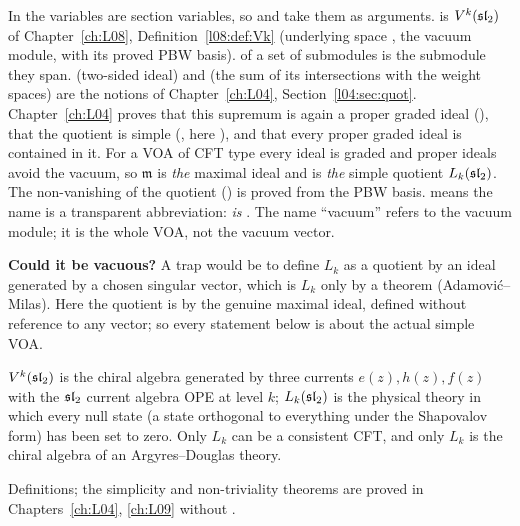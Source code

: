 \begin{dictionary}
In  the variables  are section
variables, so  and  take them as arguments.
 is $V^k(\mathfrak{sl}_2)$ of Chapter~\ref{ch:L08}, Definition~\ref{l08:def:Vk}
(underlying space , the vacuum module, with its proved PBW basis).  of a set of
submodules is the submodule they span.  (two-sided ideal) and 
(the sum of its intersections with the weight spaces) are the notions of Chapter~\ref{ch:L04},
Section~\ref{l04:sec:quot}. Chapter~\ref{ch:L04} proves that this supremum is again a proper graded ideal
(), that the quotient is simple (, here
), and that every proper graded ideal is contained in it. For a VOA of CFT type every
ideal is graded and proper ideals avoid the vacuum, so $\mathfrak m$ is \emph{the} maximal ideal and
 is \emph{the} simple quotient $L_k(\mathfrak{sl}_2)$. The non-vanishing of the quotient
() is proved from the PBW basis.  means the name is a transparent
abbreviation:  \emph{is} . The name ``vacuum''
refers to the vacuum module; it is the whole VOA, not the vacuum vector.

\textbf{Could it be vacuous?} A trap would be to define $L_k$ as a quotient by an ideal generated by a chosen
singular vector, which is $L_k$ only by a theorem (Adamovi\'c--Milas). Here the quotient is by the genuine
maximal ideal, defined without reference to any vector; so every statement below is about the actual
simple VOA.
\end{dictionary}

\begin{physics}
$V^k(\mathfrak{sl}_2)$ is the chiral algebra generated by three currents $e(z),h(z),f(z)$ with the $\mathfrak{sl}_2$
current algebra OPE at level $k$; $L_k(\mathfrak{sl}_2)$ is the physical theory in which every null state (a state
orthogonal to everything under the Shapovalov form) has been set to zero. Only $L_k$ can be a consistent
CFT, and only $L_k$ is the chiral algebra of an Argyres--Douglas theory.
\end{physics}

\begin{status}
Definitions; the simplicity and non-triviality theorems are proved in Chapters~\ref{ch:L04},
\ref{ch:L09} without .
\end{status}

